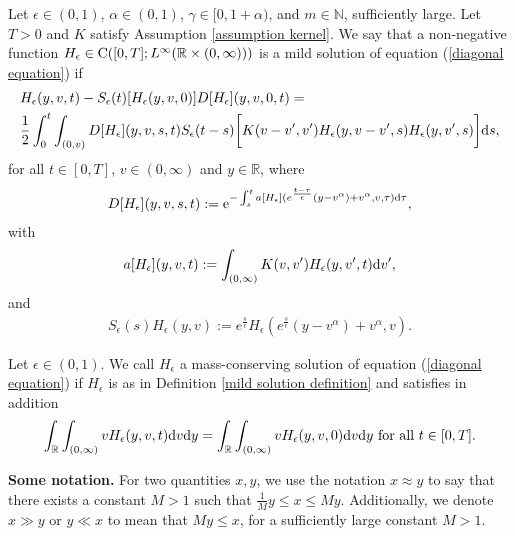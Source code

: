 \documentclass[11pt]{article}
\numberwithin{equation}{section}
\newcommand{\der}{\textup{d}}
\begin{document}
\begin{defi}\label{mild solution definition}
    Let $\epsilon\in(0,1)$, $\alpha\in(0,1)$, $\gamma\in[0,1+\alpha)$, and $m\in\mathbb{N}$, sufficiently large. Let $T>0$ and $K$ satisfy Assumption \ref{assumption kernel}. We say that a non-negative function $H_{\epsilon}\in\textup{C}([0,T];L^{
    \infty}(\mathbb{R}\times (0,\infty)))$ 
is a mild solution of equation (\ref{diagonal equation}) if
\begin{align}\label{mild solution equation}
&H_{\epsilon}(y,v,t)-S_{\epsilon}(t)[H_{\epsilon}(y,v,0) ] D[H_{\epsilon}](y,v,0,t)=\\
&\frac{1}{2}\int_{0}^{t}\int_{(0,v)}D[H_{\epsilon}](y,v,s,t)
S_{\epsilon}(t-s)\bigg[K(v-v',v')H_{\epsilon}(y,v-v',s) H_{\epsilon}(y,v',s)\bigg]\der s,\nonumber 
\end{align}
for all $t\in[0,T]$, $v\in(0,\infty)$  and $y \in\mathbb{R}$, where
\begin{align}\label{definition s mild}
  D[H_{\epsilon}](y,v,s,t):=  \textup{e}^{-\int_{s}^{t}a[H_{\epsilon}](e^{\frac{t-\tau}{\epsilon}}(y-v^{\alpha})+v^{\alpha},v,\tau)\der\tau},
\end{align}
with
\begin{align}\label{general a f def}
a[H_{\epsilon}](y,v,t):=\int_{(0,\infty)}K(v,v')H_{\epsilon}(y,v',t)\der v',
\end{align}
and
\begin{align}
    S_{\epsilon}(s)H_{\epsilon}(y,v):=e^{\frac{s}{\epsilon}}H_{\epsilon}(e^{\frac{s}{\epsilon}}(y-v^{\alpha})+v^{\alpha},v).\label{definition semigroup}
\end{align}
\end{defi}

\begin{defi}\label{mass cons defi sol}
  Let $\epsilon\in(0,1)$. We call $H_{\epsilon}$ a mass-conserving solution of equation  (\ref{diagonal equation}) if $H_{\epsilon}$ is as in Definition \ref{mild solution definition} and satisfies in addition
   \begin{align*}
              \int_{\mathbb{R}}\int_{(0,\infty)}vH_{\epsilon}(y,v,t)\der v\der y= \int_{\mathbb{R}}\int_{(0,\infty)}vH_{\epsilon}(y,v,0)\der v\der y   \textup{ for all } t\in[0,T].
   \end{align*}
\end{defi}
\noindent\textbf{Some notation.} For two quantities $x,y$, we use the notation
$x \approx y$ to say that there exists a constant $M > 1$ such that $\frac{1}{M}y
\leq x \leq M y$.  Additionally, we denote
$x \gg y$ or $y \ll x$ to mean that $M y\leq x$, for a sufficiently large constant $M>1$.
\end{document}
